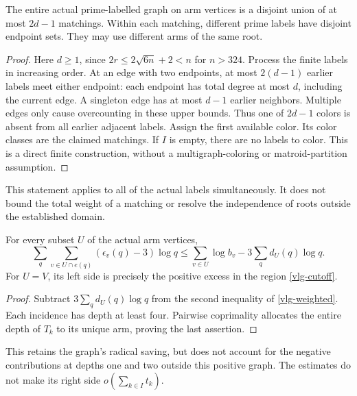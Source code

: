 \begin{theorem}\label{vlg-matchings}
The entire actual prime-labelled graph on arm vertices is a disjoint
union of at most \(2d-1\) matchings. Within each matching, different
prime labels have disjoint endpoint sets. They may use different
arms of the same root.
\end{theorem}
\begin{proof}
Here \(d\geq1\), since
\(2r\leq2\sqrt{6n}+2<n\) for \(n>324\).
Process the finite labels in increasing order. At an edge with two
endpoints, at most \(2(d-1)\) earlier labels meet either endpoint:
each endpoint has total degree at most \(d\), including the current
edge. A singleton edge has at most \(d-1\) earlier neighbors.
Multiple edges only cause overcounting in these upper bounds.
Thus one of \(2d-1\) colors is absent from all earlier adjacent
labels. Assign the first available color. Its color classes are the
claimed matchings. If \(I\) is empty, there are no labels to color.
This is a direct finite construction, without a multigraph-coloring
or matroid-partition assumption.
\end{proof}

This statement applies to all of the actual labels simultaneously.
It does not bound the total weight of a matching or resolve the
independence of roots outside the established domain.

\begin{proposition}\label{vlg-net}
For every subset \(U\) of the actual arm vertices,
\begin{equation}\label{vlg-net-equation}
 \sum_q\sum_{v\in U\cap e(q)}(\epsilon_v(q)-3)\log q
 \leq\sum_{v\in U}\log b_v-3\sum_q d_U(q)\log q.
\end{equation}
For \(U=V\), its left side is precisely the positive excess in the
region \eqref{vlg-cutoff}.
\end{proposition}
\begin{proof}
Subtract \(3\sum_q d_U(q)\log q\) from the second inequality of
\eqref{vlg-weighted}. Each incidence has depth at least four.
Pairwise coprimality allocates the entire depth of \(T_k\) to its
unique arm, proving the last assertion.
\end{proof}

This retains the graph's radical saving, but does not account for
the negative contributions at depths one and two outside this
positive graph. The estimates do not make its right side
\(o(\sum_{k\in I}t_k)\).

